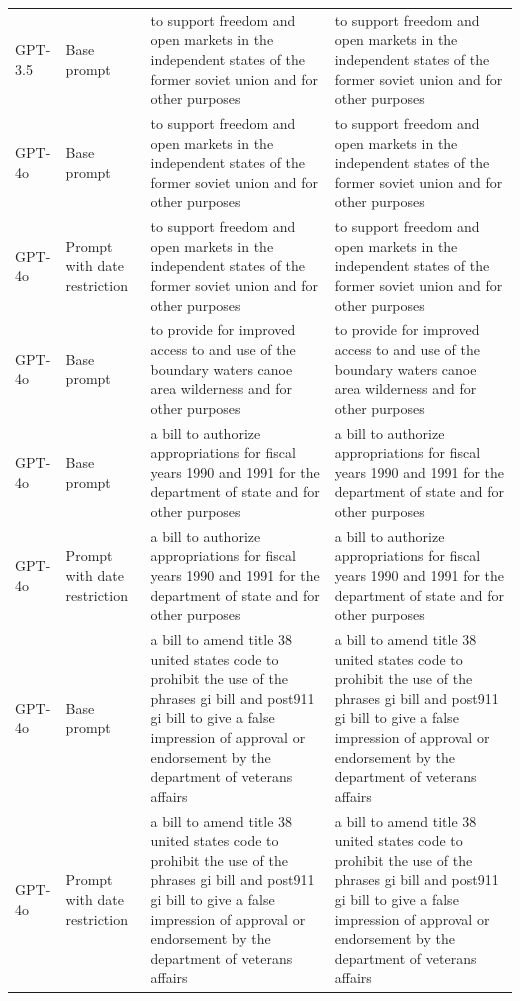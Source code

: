 \begin{longtable}{>{\raggedright\arraybackslash}p{1.4cm}>{\raggedright\arraybackslash}p{1.4cm}>{\raggedright\arraybackslash}p{5.5cm}>{\raggedright\arraybackslash}p{5.5cm}}
GPT-3.5 & Base prompt & to support freedom and open markets in the independent states of the former soviet union and for other purposes & to support freedom and open markets in the independent states of the former soviet union and for other purposes\\
GPT-4o & Base prompt & to support freedom and open markets in the independent states of the former soviet union and for other purposes & to support freedom and open markets in the independent states of the former soviet union and for other purposes\\
GPT-4o & Prompt with date restriction & to support freedom and open markets in the independent states of the former soviet union and for other purposes & to support freedom and open markets in the independent states of the former soviet union and for other purposes\\
GPT-4o & Base prompt & to provide for improved access to and use of the boundary waters canoe area wilderness and for other purposes & to provide for improved access to and use of the boundary waters canoe area wilderness and for other purposes\\
GPT-4o & Base prompt & a bill to authorize appropriations for fiscal years 1990 and 1991 for the department of state and for other purposes & a bill to authorize appropriations for fiscal years 1990 and 1991 for the department of state and for other purposes\\
GPT-4o & Prompt with date restriction & a bill to authorize appropriations for fiscal years 1990 and 1991 for the department of state and for other purposes & a bill to authorize appropriations for fiscal years 1990 and 1991 for the department of state and for other purposes\\
GPT-4o & Base prompt & a bill to amend title 38 united states code to prohibit the use of the phrases gi bill and post911 gi bill to give a false impression of approval or endorsement by the department of veterans affairs & a bill to amend title 38 united states code to prohibit the use of the phrases gi bill and post911 gi bill to give a false impression of approval or endorsement by the department of veterans affairs\\
GPT-4o & Prompt with date restriction & a bill to amend title 38 united states code to prohibit the use of the phrases gi bill and post911 gi bill to give a false impression of approval or endorsement by the department of veterans affairs & a bill to amend title 38 united states code to prohibit the use of the phrases gi bill and post911 gi bill to give a false impression of approval or endorsement by the department of veterans affairs\\

\end{longtable}
